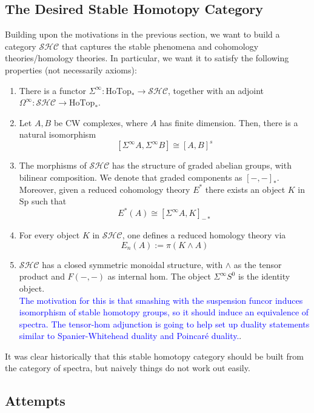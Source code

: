 \documentclass{article}
\theoremstyle{definition}
\begin{document}
\subsection{The Desired Stable Homotopy Category}
Building upon the motivations in the previous section, we want to build a category $\mathcal{SHC}$ that captures the stable phenomena and cohomology theories/homology theories. In particular, we want it to satisfy the following properties (not necessarily axioms):
\begin{enumerate}
    \item There is a functor $\Sigma^{\infty}: \textrm{HoTop}_*\to \mathcal{SHC}$, together with an adjoint $\Omega^{\infty}: \mathcal{SHC}\to \textrm{HoTop}_*$. 

    \item Let $A,B$ be CW complexes, where $A$ has finite dimension. Then, there is a natural isomorphism
    \[[\Sigma^{\infty}A, \Sigma^{\infty}B]\cong [A,B]^s\]

    \item The morphisms of $\mathcal{SHC}$ has the structure of graded abelian groups, with bilinear composition. We denote that graded components as $[-,-]_*$. Moreover, given a reduced cohomology theory $E^*$ there exists an object $K$ in $\textrm{Sp}$ such that 
    \[E^*(A)\cong [\Sigma^{\infty}A, K]_{-*}\]

    \item For every object $K$ in $\mathcal{SHC}$, one defines a reduced homology theory via 
    \[E_n(A):=\pi(K\wedge A)\]

    \item $\mathcal{SHC}$ has a closed symmetric monoidal structure, with $\wedge$ as the tensor product and $F(-,-)$ as internal hom. The object $\Sigma^{\infty}S^0$ is the identity object.\\
    \textcolor{blue}{The motivation for this is that smashing with the suspension funcor induces isomorphism of stable homotopy groups, so it should induce an equivalence of spectra. The tensor-hom adjunction is going to help set up duality statements similar to Spanier-Whitehead duality and Poincar\'e duality.}.
\end{enumerate}
It was clear historically that this stable homotopy category should be built from the category of spectra, but naively things do not work out easily.

\subsection{Attempts}
\end{document}
